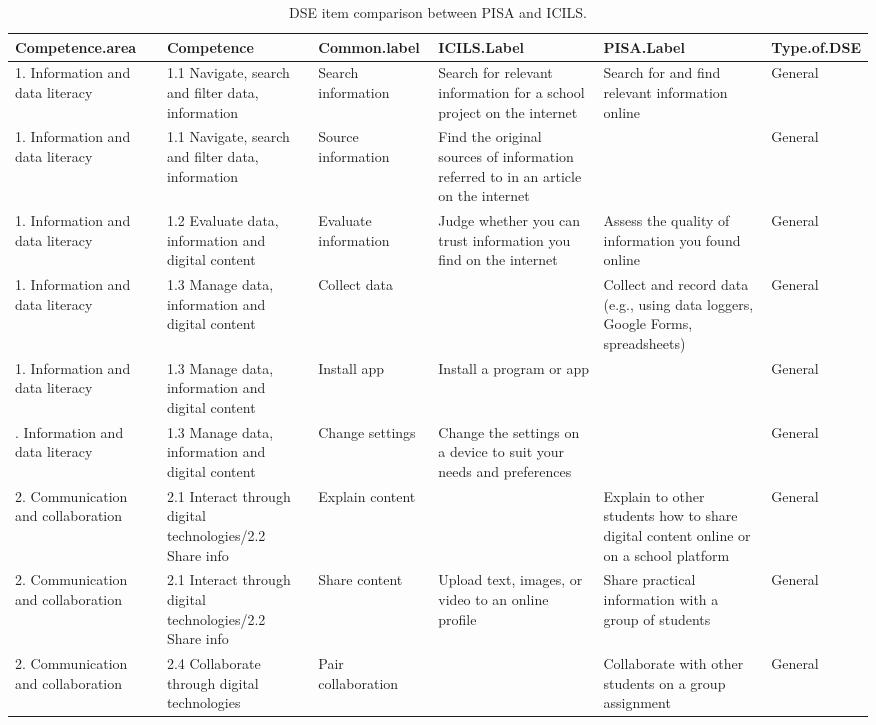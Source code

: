 \documentclass[
  letterpaper,
  DIV=11,
  numbers=noendperiod]{scrartcl}
\begin{document}
\begin{longtable}[t]{llllll}

\caption{\label{tbl-comparison}DSE item comparison between PISA and
ICILS.}

\tabularnewline

\toprule
Competence.area & Competence & Common.label & ICILS.Label & PISA.Label & Type.of.DSE\\
\midrule
1. Information and data literacy & 1.1 Navigate, search and filter data, information & Search information & Search for relevant information for a school project on the internet & Search for and find relevant information online & General\\
1. Information and data literacy & 1.1 Navigate, search and filter data, information & Source information & Find the original sources of information referred to in an article on the internet &  & General\\
1. Information and data literacy & 1.2 Evaluate data, information and digital content & Evaluate information & Judge whether you can trust information you find on the internet & Assess the quality of information you found online & General\\
1. Information and data literacy & 1.3 Manage data, information and digital content & Collect data &  & Collect and record data (e.g., using data loggers, Google Forms, spreadsheets) & General\\
1. Information and data literacy & 1.3 Manage data, information and digital content & Install app & Install a program or app &  & General\\
\addlinespace
1. Information and data literacy & 1.3 Manage data, information and digital content & Change settings & Change the settings on a device to suit your needs and preferences &  & General\\
2. Communication and collaboration & 2.1 Interact through digital technologies/2.2 Share info & Explain content &  & Explain to other students how to share digital content online or on a school platform & General\\
2. Communication and collaboration & 2.1 Interact through digital technologies/2.2 Share info & Share content & Upload text, images, or video to an online profile & Share practical information with a group of students & General\\
2. Communication and collaboration & 2.4 Collaborate through digital technologies & Pair collaboration &  & Collaborate with other students on a group assignment & General\\

\end{longtable}
\end{document}
